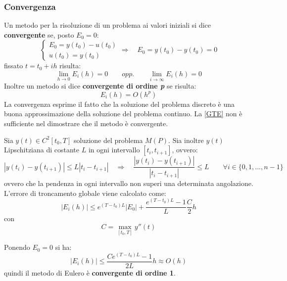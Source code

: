 \subsubsection{Convergenza}
Un metodo per la risoluzione di un problema ai valori iniziali si dice \textbf{convergente} se, posto $E_0=0$:
\begin{equation*}
	\begin{cases}
		E_0 = y(t_0) - u(t_0) \\
		u(t_0) = y(t_0)
	\end{cases}
\Rightarrow \quad E_0 = y(t_0)-y(t_0)=0
\end{equation*} 
fissato $t = t_0 + ih$ risulta:
\begin{equation*}
	\lim_{h \rightarrow 0} E_i(h) = 0 \qquad opp. \qquad \lim_{i \rightarrow \infty	} E_i(h) = 0 
\end{equation*}
Inoltre un metodo si dice \textbf{convergente di ordine \textit{p}} se risulta:
\begin{equation}
	E_i(h) = O(h^p)
\end{equation}
La convergenza esprime il fatto che la soluzione del problema discreto è una buona approssimazione della soluzione del problema continuo. La \ref{GTE} non è sufficiente nel dimostrare che il metodo è convergente.

\begin{theorem}
	Sia $y(t)\in C^2[t_0,T]$ soluzione del problema $M(P)$. Sia inoltre $y(t)$ Lipschitziana di costante $L$ in ogni intervallo $[t_i, t_{i+1}]$, ovvero:
	\begin{equation*}
		|y(t_i) - y(t_{i+1})| \leq L |t_i - t_{i+1}| \quad \Rightarrow \quad \dfrac{|y(t_i) - y(t_{i+1})|}{|t_i - t_{i+1}|} \leq L \quad \quad \forall i\in \{0,1,...,n-1\}
	\end{equation*}
	ovvero che la pendenza in ogni intervallo non superi una determinata angolazione.
	\\L'errore di troncamento globale viene calcolato come:
	\begin{equation*}
		|E_i(h)| \leq e^{(T-t_0)L}|E_0| + \dfrac{e^{(T-t_0)L}-1}{L}\dfrac{C}{2}h
	\end{equation*}
	con \[ C=
	\max_{[t_0,T]} 
	 y''(t) \]
\end{theorem}
Ponendo $E_0=0$ si ha:
\begin{equation}
	\label{gte}
	|E_i(h)| \leq \dfrac{Ce^{(T-t_0)L}-1}{2L}h \approx O(h)
\end{equation}
quindi il metodo di Eulero è \textbf{convergente di ordine 1}.

